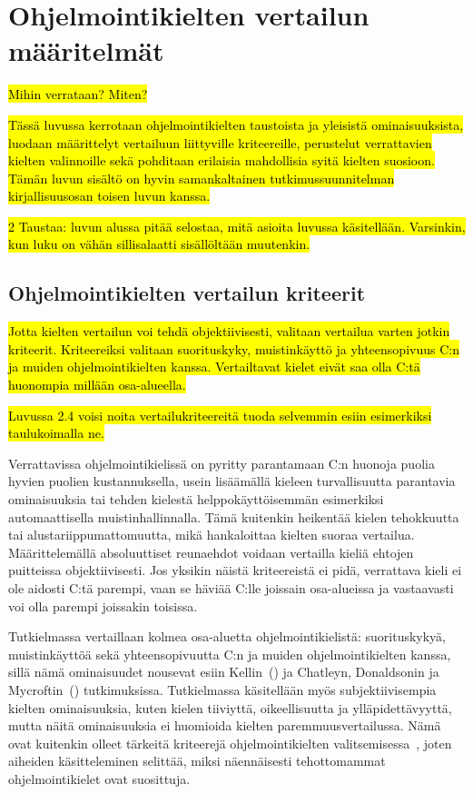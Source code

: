 \section{Ohjelmointikielten vertailun määritelmät}

\hl{Mihin verrataan? Miten?}

\hl{Tässä luvussa kerrotaan ohjelmointikielten taustoista ja yleisistä
ominaisuuksista, luodaan määrittelyt vertailuun liittyville kriteereille,
perustelut verrattavien kielten valinnoille sekä pohditaan erilaisia
mahdollisia syitä kielten suosioon. Tämän luvun sisältö on hyvin samankaltainen
tutkimussuunnitelman kirjallisuusosan toisen luvun kanssa.}

\hl{ 2 Taustaa: luvun alussa pitää selostaa, mitä asioita luvussa käsitellään.
Varsinkin, kun luku on vähän sillisalaatti sisällöltään muutenkin. }

\subsection{Ohjelmointikielten vertailun kriteerit}
\label{sec:abs}

\hl{Jotta kielten vertailun voi tehdä objektiivisesti, valitaan vertailua
varten jotkin kriteerit. Kriteereiksi valitaan suorituskyky, muistinkäyttö ja
yhteensopivuus C:n ja muiden ohjelmointikielten kanssa. Vertailtavat kielet
eivät saa olla C:tä huonompia millään osa-alueella.}

\hl{ Luvussa 2.4 voisi noita vertailukriteereitä tuoda selvemmin esiin
esimerkiksi taulukoimalla ne. }

Verrattavissa ohjelmointikielissä on pyritty parantamaan C:n huonoja puolia
hyvien puolien kustannuksella, usein lisäämällä kieleen turvallisuutta
parantavia ominaisuuksia tai tehden kielestä helppokäyttöisemmän esimerkiksi
automaattisella muistinhallinnalla. Tämä kuitenkin heikentää kielen tehokkuutta
tai alustariippumattomuutta, mikä hankaloittaa kielten suoraa vertailua.
Määrittelemällä absoluuttiset reunaehdot voidaan vertailla kieliä ehtojen
puitteissa objektiivisesti. Jos yksikin näistä kriteereistä ei pidä, verrattava
kieli ei ole aidosti C:tä parempi, vaan se häviää C:lle joissain osa-alueissa
ja vastaavasti voi olla parempi joissakin toisissa.

Tutkielmassa vertaillaan kolmea osa-aluetta ohjelmointikielistä: suorituskykyä,
muistinkäyttöä sekä yhteensopivuutta C:n ja muiden ohjelmointikielten kanssa,
sillä nämä ominaisuudet nousevat esiin Kellin~(\citeyear{somemeantforc}) ja
Chatleyn, Donaldsonin ja Mycroftin~(\citeyear{next7000}) tutkimuksissa.
Tutkielmassa käsitellään myös subjektiivisempia kielten ominaisuuksia, kuten
kielen tiiviyttä, oikeellisuutta ja
ylläpidettävyyttä, mutta näitä ominaisuuksia ei huomioida kielten
paremmuusvertailussa. Nämä ovat kuitenkin olleet tärkeitä kriteerejä
ohjelmointikielten valitsemisessa~\citep{empiricalpopularity}, joten aiheiden
käsitteleminen selittää, miksi näennäisesti tehottomammat ohjelmointikielet
ovat suosittuja.

